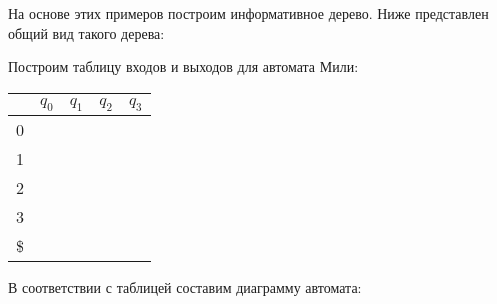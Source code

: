 На основе этих примеров построим информативное дерево. Ниже представлен общий вид такого дерева:


Построим таблицу входов и выходов для автомата Мили:
\begin{table}[H]
    \centering
    \begin{tabularx}{\textwidth}{|C|C|C|C|C|} \hline
            & $q_0$ &  $q_1$ &  $q_2$ &  $q_3$ \\
           &  &  &  &  \\
           &  &  &  &  \\
           &  &  &  &  \\
           &  &  &  &  \\
        \hline
        \$  &  &  &  &  \\
        \hline
    \end{tabularx}
\end{table}

В соответствии с таблицей составим диаграмму автомата:


